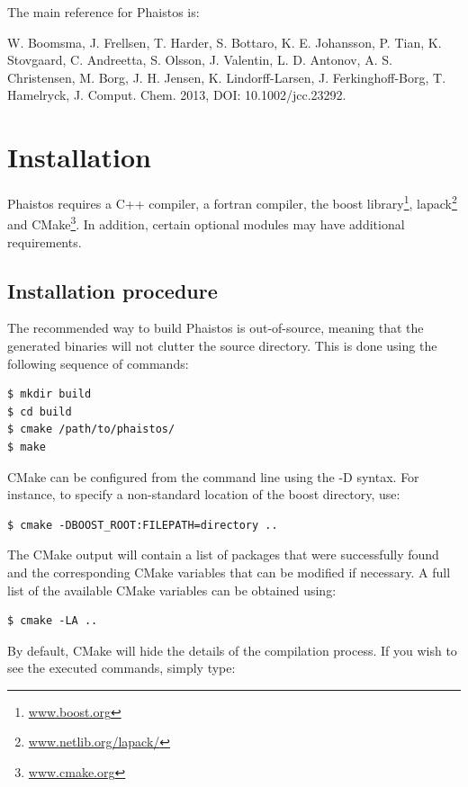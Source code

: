 \documentclass[11pt,a4paper,twoside]{book}
\begin{document}
The main reference for Phaistos is:

\vspace{1em}\noindent W. Boomsma, J. Frellsen, T. Harder, S. Bottaro,
K. E. Johansson, P. Tian, K. Stovgaard, C. Andreetta, S. Olsson,
J. Valentin, L. D. Antonov, A. S. Christensen, M. Borg, J. H. Jensen,
K. Lindorff-Larsen, J. Ferkinghoff-Borg, T. Hamelryck,
J. Comput. Chem. 2013, DOI: 10.1002/jcc.23292.

\chapter{Installation}
\label{cha:installation}

Phaistos requires a C++ compiler, a fortran compiler, the boost
library\footnote{\url{www.boost.org}},
lapack\footnote{\url{www.netlib.org/lapack/}} and
CMake\footnote{\url{www.cmake.org}}. In addition, certain optional
modules may have additional requirements.

\section{Installation procedure}
\label{sec:inst-proc}

The recommended way to build Phaistos is out-of-source, meaning that the
generated binaries will not clutter the source directory. This is done
using the following sequence of commands:

\begin{verbatim}
$ mkdir build
$ cd build
$ cmake /path/to/phaistos/
$ make
\end{verbatim}

\noindent CMake can be configured from the command line using the -D syntax. For
instance, to specify a non-standard location of the boost directory, use:

\begin{verbatim}
$ cmake -DBOOST_ROOT:FILEPATH=directory ..
\end{verbatim}

\noindent The CMake output will contain a list of packages that were successfully
found and the corresponding CMake variables that can be modified if
necessary. A full list of the available CMake variables can be obtained
using:

\begin{verbatim}
$ cmake -LA ..
\end{verbatim}

\noindent By default, CMake will hide the details of the compilation
process. If you wish to see the executed commands, simply type:
\end{document}
